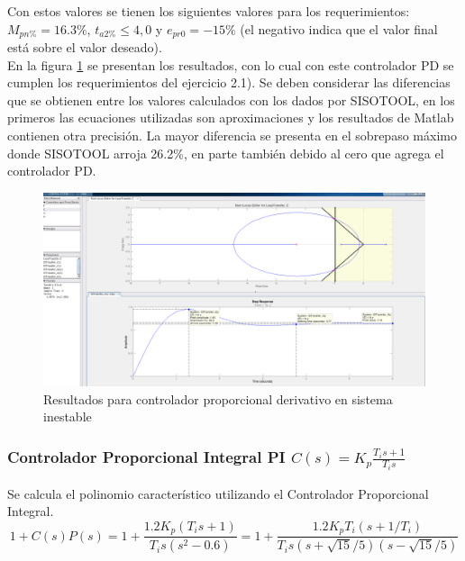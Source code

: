 \documentclass{report}
\begin{document}
Con estos valores se tienen los siguientes valores para los requerimientos:\\

\(M_{pn\%} = 16.3\%\), \(t_{a2\%} \leqslant 4,0 \) y \(e_{pr0}=-15\%\) (el negativo indica que el valor final está sobre el valor deseado).\\

En la figura \ref{F:P2_PD} se presentan los resultados, con lo cual con este controlador PD se cumplen los requerimientos del ejercicio 2.1). Se deben considerar las diferencias que se obtienen entre los valores calculados con los dados por SISOTOOL, en los primeros las ecuaciones utilizadas 
son aproximaciones y los resultados de Matlab contienen otra precisión. La mayor diferencia se presenta en el sobrepaso máximo donde SISOTOOL arroja 26.2\%, en parte también debido al cero que agrega 
el controlador PD.

\begin{figure}[h!]
    \centering  
    \includegraphics[width=1\textwidth]{P2_PD.png}
    \caption{Resultados para controlador proporcional derivativo en sistema inestable}
    \label{F:P2_PD}
\end{figure}

\subsubsection{Controlador Proporcional Integral PI \(C(s) = K_p \frac{T_is+1}{T_is}\)}

Se calcula el polinomio característico utilizando el Controlador Proporcional Integral.\\

\begin{equation*}
    1+C(s)P(s)= 1 + \frac{1.2K_p(T_is+1)}{T_is(s^2-0.6)} = 1 + \frac{1.2K_pT_i(s+1/T_i)}{T_is(s+\sqrt{15}/5)(s-\sqrt{15}/5)}
    \label{Eq:13}
\end{equation*}
\end{document}
